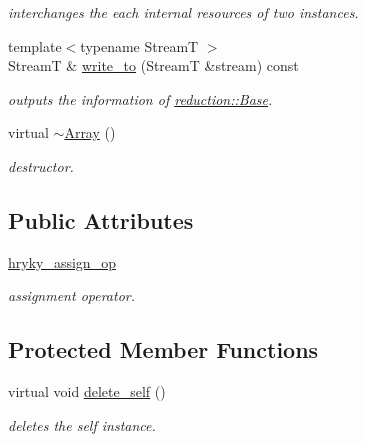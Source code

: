\begin{DoxyCompactItemize}
\begin{DoxyCompactList}\small\item\em interchanges the each internal resources of two instances. \end{DoxyCompactList}\item 
\hypertarget{classhryky_1_1reduction_1_1_base_a709cc7c48e1c90fe253739e46d82aa19}{{\footnotesize template$<$typename Stream\-T $>$ }\\Stream\-T \& \hyperlink{classhryky_1_1reduction_1_1_base_a709cc7c48e1c90fe253739e46d82aa19}{write\-\_\-to} (Stream\-T \&stream) const }\label{classhryky_1_1reduction_1_1_base_a709cc7c48e1c90fe253739e46d82aa19}

\begin{DoxyCompactList}\small\item\em outputs the information of \hyperlink{classhryky_1_1reduction_1_1_base}{reduction\-::\-Base}. \end{DoxyCompactList}\item 
\hypertarget{classhryky_1_1reduction_1_1_array_aa8d1e54e9811081bc03a232b29d0342c}{virtual \hyperlink{classhryky_1_1reduction_1_1_array_aa8d1e54e9811081bc03a232b29d0342c}{$\sim$\-Array} ()}\label{classhryky_1_1reduction_1_1_array_aa8d1e54e9811081bc03a232b29d0342c}

\begin{DoxyCompactList}\small\item\em destructor. \end{DoxyCompactList}\end{DoxyCompactItemize}
\subsection*{Public Attributes}
\begin{DoxyCompactItemize}
\item 
\hypertarget{classhryky_1_1reduction_1_1_array_a6152f3a8b20661b94b1df55d281cbfbf}{\hyperlink{classhryky_1_1reduction_1_1_array_a6152f3a8b20661b94b1df55d281cbfbf}{hryky\-\_\-assign\-\_\-op}}\label{classhryky_1_1reduction_1_1_array_a6152f3a8b20661b94b1df55d281cbfbf}

\begin{DoxyCompactList}\small\item\em assignment operator. \end{DoxyCompactList}\end{DoxyCompactItemize}
\subsection*{Protected Member Functions}
\begin{DoxyCompactItemize}
\item 
virtual void \hyperlink{classhryky_1_1reduction_1_1_base_a100265b04179500cd7901c8afea64eb0}{delete\-\_\-self} ()
\begin{DoxyCompactList}\small\item\em deletes the self instance. \end{DoxyCompactList}\end{DoxyCompactItemize}


